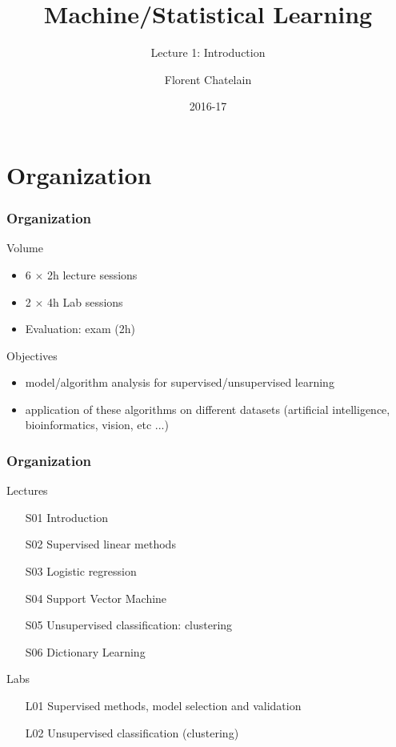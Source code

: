 \documentclass[compress, smaller, serif, 9pt]{beamer}
\title[Statistical Learning]{Machine/Statistical Learning}
\subtitle{Lecture 1: Introduction}
\author[Florent Chatelain]{Florent Chatelain}
\institute{Filière SICOM, 3A}
\date{2016-17}
\begin{document}
\maketitle


\section{Organization}

\begin{frame}
  \frametitle{Organization}

\begin{block}{Volume}
\begin{itemize}
 \item 6 $\times$ 2h lecture sessions
 \item 2 $\times$ 4h Lab sessions
 \item Evaluation: exam (2h)
\end{itemize}
\end{block}

\begin{block}{Objectives}
\begin{itemize}
 \item model/algorithm analysis for supervised/unsupervised learning
 \item application of these algorithms on different datasets (artificial intelligence, bioinformatics, vision, etc ...)
\end{itemize}
\end{block}

\end{frame}

\begin{frame}
  \frametitle{Organization}
\begin{block}{Lectures}
\begin{itemize}
 \item[S01] Introduction
 \item[S02] Supervised linear methods 
 \item[S03] Logistic regression
 \item[S04] Support Vector Machine
 \item[S05] Unsupervised classification: clustering
 \item[S06] Dictionary Learning
\end{itemize}
\end{block}

\begin{block}{Labs}
\begin{itemize}
 \item[L01] Supervised methods, model selection and validation
 \item[L02] Unsupervised classification (clustering)
\end{itemize}
\end{block}


\end{frame}
\end{document}
